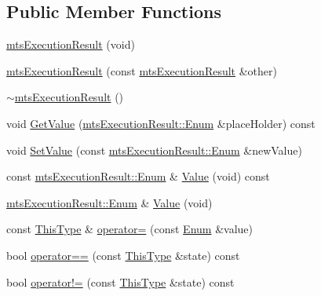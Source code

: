 \subsection*{Public Member Functions}
\begin{DoxyCompactItemize}
\item 
\hyperlink{classmts_execution_result_a7de70242d4fb1176a7466e9b4d6421c2}{mts\-Execution\-Result} (void)
\item 
\hyperlink{classmts_execution_result_ade865f12c4af4032cf1b4ed12924553e}{mts\-Execution\-Result} (const \hyperlink{classmts_execution_result}{mts\-Execution\-Result} \&other)
\item 
\hyperlink{classmts_execution_result_a709789da535ce58b0788478dd1c759f3}{$\sim$mts\-Execution\-Result} ()
\item 
void \hyperlink{classmts_execution_result_ac8bfd1c33448b22bb86f44d9369d27dd}{Get\-Value} (\hyperlink{classmts_execution_result_a10c4246c82ac99d88e5f716f79407b77}{mts\-Execution\-Result\-::\-Enum} \&place\-Holder) const 
\item 
void \hyperlink{classmts_execution_result_a331e5ea0f1fa9eb93debdbc6cbe6d1ec}{Set\-Value} (const \hyperlink{classmts_execution_result_a10c4246c82ac99d88e5f716f79407b77}{mts\-Execution\-Result\-::\-Enum} \&new\-Value)
\item 
const \hyperlink{classmts_execution_result_a10c4246c82ac99d88e5f716f79407b77}{mts\-Execution\-Result\-::\-Enum} \& \hyperlink{classmts_execution_result_a6e65daeab100e17cd3e26530ae92fc83}{Value} (void) const 
\item 
\hyperlink{classmts_execution_result_a10c4246c82ac99d88e5f716f79407b77}{mts\-Execution\-Result\-::\-Enum} \& \hyperlink{classmts_execution_result_ac5b1224e542a98a3a10ce261bcec0147}{Value} (void)
\item 
const \hyperlink{classmts_execution_result_a8b0081f3c70da65307a17faace94b176}{This\-Type} \& \hyperlink{classmts_execution_result_a56d99010cdc4fae5e010a7b0c400d390}{operator=} (const \hyperlink{classmts_execution_result_a10c4246c82ac99d88e5f716f79407b77}{Enum} \&value)
\item 
bool \hyperlink{classmts_execution_result_a6b9766d9a66f8b2d6aebc46fe6b411cd}{operator==} (const \hyperlink{classmts_execution_result_a8b0081f3c70da65307a17faace94b176}{This\-Type} \&state) const 
\item 
bool \hyperlink{classmts_execution_result_a3e263b0bac01b5ffbe56226d550df660}{operator!=} (const \hyperlink{classmts_execution_result_a8b0081f3c70da65307a17faace94b176}{This\-Type} \&state) const 

\end{DoxyCompactItemize}
